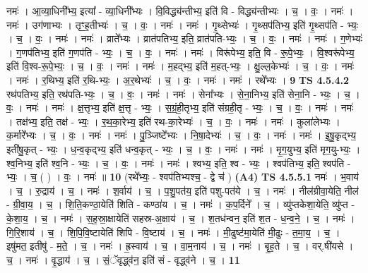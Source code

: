 \documentclass[17pt]{extarticle}
\begin{document}
                  नमः॑ । आ॒व्या॒धिनी᳚भ्य॒ इत्या᳚ - व्या॒धिनी᳚भ्यः । वि॒विद्ध्य॑न्तीभ्य॒ इति॑ वि - विद्ध्य॑न्तीभ्यः । च॒ । वः॒ । नमः॑ । नमः॑ । उग॑णाभ्यः । तृꣳ॒॒ह॒तीभ्यः॑ । च॒ । वः॒ । नमः॑ । नमः॑ । गृ॒थ्सेभ्यः॑ । गृ॒थ्सप॑तिभ्य॒ इति॑ गृ॒थ्सप॑ति - भ्यः॒ । च॒ । वः॒ । नमः॑ । नमः॑ । व्राते᳚भ्यः । व्रात॑पतिभ्य॒ इति॒ व्रात॑पति-भ्यः॒ । च॒ । वः॒ । नमः॑ । नमः॑ । ग॒णेभ्यः॑ । ग॒णप॑तिभ्य॒ इति॑ ग॒णप॑ति - भ्यः॒ । च॒ । वः॒ । नमः॑ । नमः॑ । विरू॑पेभ्य॒ इति॒ वि - रू॒पे॒भ्यः॒ । वि॒श्वरू॑पेभ्य॒ इति॑ वि॒श्व-रू॒पे॒भ्यः॒ । च॒ । वः॒ । नमः॑ । नमः॑ । म॒हद्भ्य॒ इति॑ म॒हत्-भ्यः॒ । क्षु॒ल्ल॒केभ्यः॑ । च॒ । वः॒ । नमः॑ । नमः॑ । र॒थिभ्य॒ इति॑ र॒थि-भ्यः॒ । अ॒र॒थेभ्यः॑ । च॒ । वः॒ । नमः॑ । नमः॑ । रथे᳚भ्यः । \textbf{  9} \newline
                  \newline
                                \textbf{ TS 4.5.4.2} \newline
                  रथ॑पतिभ्य॒ इति॒ रथ॑पति-भ्यः॒ । च॒ । वः॒ । नमः॑ । नमः॑ । सेना᳚भ्यः । से॒ना॒निभ्य॒ इति॑ सेना॒नि - भ्यः॒ । च॒ । वः॒ । नमः॑ । नमः॑ । क्ष॒त्तृभ्य॒ इति॑ क्ष॒त्तृ - भ्यः॒ । स॒ग्रं॒ही॒तृभ्य॒ इति॑ संग्रही॒तृ - भ्यः॒ । च॒ । वः॒ । नमः॑ । नमः॑ । तक्ष॑भ्य॒ इति॒ तक्ष॑ - भ्यः॒ । र॒थ॒का॒रेभ्य॒ इति॑ रथ-का॒रेभ्यः॑ । च॒ । वः॒ । नमः॑ । नमः॑ । कुला॑लेभ्यः । क॒र्मारे᳚भ्यः । च॒ । वः॒ । नमः॑ । नमः॑ । पु॒ञ्जिष्टे᳚भ्यः । नि॒षा॒देभ्यः॑ । च॒ । वः॒ । नमः॑ । नमः॑ । इ॒षु॒कृद्भ्य॒ इती॑षु॒कृत् - भ्यः॒ । ध॒न्व॒कृद्भ्य॒ इति॑ धन्व॒कृत् - भ्यः॒ । च॒ । वः॒ । नमः॑ । नमः॑ । मृ॒ग॒युभ्य॒ इति॑ मृग॒यु-भ्यः॒ । श्व॒निभ्य॒ इति॑ श्व॒नि - भ्यः॒ । च॒ । वः॒ । नमः॑ । नमः॑ । श्वभ्य॒ इति॒ श्व - भ्यः॒ । श्वप॑तिभ्य॒ इति॒ श्वप॑ति - भ्यः॒ । च॒ ( ) । वः॒ । नमः॑ ॥ \textbf{  10} \newline
                  \newline
                      (रथे᳚भ्यः॒ - श्वप॑तिभ्यश्च॒ - द्वे च॑ )  \textbf{(A4)} \newline \newline
                                \textbf{ TS 4.5.5.1} \newline
                  नमः॑ । भ॒वाय॑ । च॒ । रु॒द्राय॑ । च॒ । नमः॑ । श॒र्वाय॑ । च॒ । प॒शु॒पत॑य॒ इति॑ पशु-पत॑ये । च॒ । नमः॑ । नील॑ग्रीवा॒येति॒ नील॑ - ग्री॒वा॒य॒ । च॒ । शि॒ति॒कण्ठा॒येति॑ शिति - कण्ठा॑य । च॒ । नमः॑ । क॒प॒र्दिने᳚ । च॒ । व्यु॑प्तकेशा॒येति॒ व्यु॑प्त - के॒शा॒य॒ । च॒ । नमः॑ । स॒ह॒स्रा॒क्षायेति॑ सहस्र-अ॒क्षाय॑ । च॒ । श॒तध॑न्वन॒ इति॑ श॒त - ध॒न्व॒ने॒ । च॒ । नमः॑ । गि॒रि॒शाय॑ । च॒ । शि॒पि॒वि॒ष्टायेति॑ शिपि - वि॒ष्टाय॑ । च॒ । नमः॑ । मी॒ढुष्ट॑मा॒येति॑ मी॒ढुः - त॒मा॒य॒ । च॒ । इषु॑मत॒ इतीषु॑ - म॒ते॒ । च॒ । नमः॑ । ह्र॒स्वाय॑ । च॒ । वा॒म॒नाय॑ । च॒ । नमः॑ । बृ॒ह॒ते । च॒ । वर्.षी॑यसे । च॒ । नमः॑ । वृ॒द्धाय॑ । च॒ । सं॒ॅवृद्ध्व॑न॒ इति॑ सं - वृद्ध्व॑ने । च॒ । \textbf{  11} \newline
\end{document}
